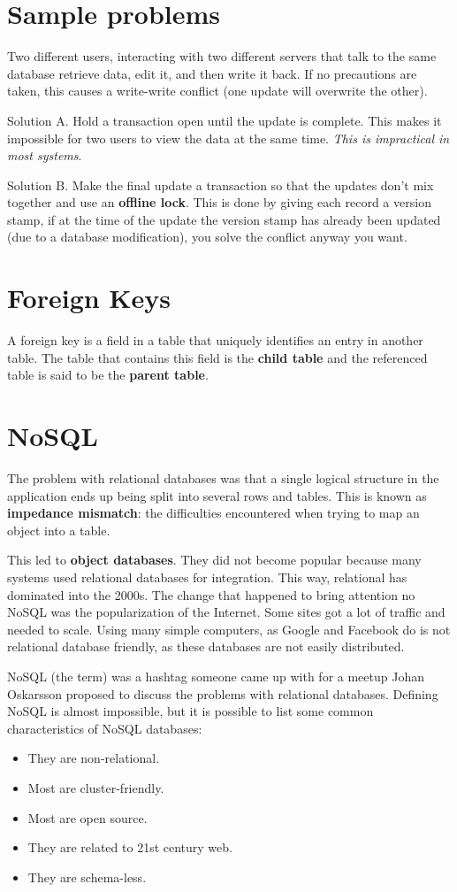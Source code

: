 \documentclass[oneside]{book} %
\theoremstyle{plain}
\begin{document}
\section{Sample problems}
Two different users, interacting with two different servers that talk to the
same database retrieve data, edit it, and then write it back. If no precautions
are taken, this causes a write-write conflict (one update will overwrite the
other).

Solution A. Hold a transaction open until the update is complete. This makes it
impossible for two users to view the data at the same time. \textit{This is
impractical in most systems}.

Solution B. Make the final update a transaction so that the updates don't mix
together and use an \textbf{offline lock}. This is done by giving each record a
version stamp, if at the time of the update the version stamp has already been
updated (due to a database modification), you solve the conflict anyway you
want.

\section{Foreign Keys}
A foreign key is a field in a table that uniquely identifies an entry in another
table. The table that contains this field is the \textbf{child table} and the
referenced table is said to be the \textbf{parent table}.

\section{NoSQL}
The problem with relational databases was that a single logical structure in the
application ends up being split into several rows and tables. This is known as
\textbf{impedance mismatch}: the difficulties encountered when trying to map
an object into a table.

This led to \textbf{object databases}. They did not become popular because many
systems used relational databases for integration. This way, relational has
dominated into the 2000s. The change that happened to bring attention no NoSQL
was the popularization of the Internet. Some sites got a lot of traffic and
needed to scale. Using many simple computers, as Google and Facebook do is not
relational database friendly, as these databases are not easily distributed.

NoSQL (the term) was a hashtag someone came up with for a meetup Johan
Oskarsson proposed to discuss the problems with relational databases. Defining
NoSQL is almost impossible, but it is possible to list some common
characteristics of NoSQL databases:
\begin{itemize}
 \item They are non-relational.
 \item Most are cluster-friendly.
 \item Most are open source.
 \item They are related to 21st century web.
 \item They are schema-less.
\end{itemize}
\end{document}
